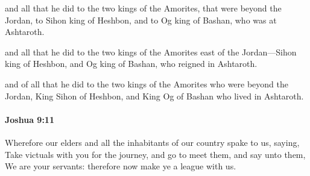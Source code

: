			\begin{versebox}
					\item[BHS] 
					\item[ASV] and all that he did to the two kings of the Amorites, that were beyond the Jordan, to Sihon king of Heshbon, and to Og king of Bashan, who was at Ashtaroth.
					\item[NIV] and all that he did to the two kings of the Amorites east of the Jordan—Sihon king of Heshbon, and Og king of Bashan, who reigned in Ashtaroth.
					\item[NRSV] and of all that he did to the two kings of the Amorites who were beyond the Jordan, King Sihon of Heshbon, and King Og of Bashan who lived in Ashtaroth.
			\end{versebox}

		\paragraph{Joshua 9:11} %
			\label{JOSHUA-9-11}

			Wherefore our elders and all the inhabitants of our country spake to us, saying, Take victuals with you for the journey, and go to meet them, and say unto them, We are your servants: therefore now make ye a league with us.

